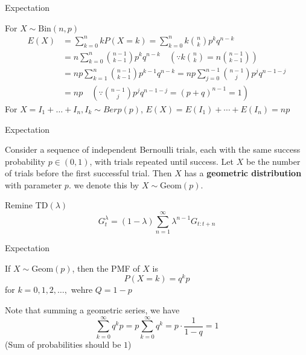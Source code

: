 \documentclass{beamer}
\newcommand{\tb}[1]{\textbf{#1}}
\begin{document}
\begin{frame}{Expectation}
    \begin{example}
        For $X \sim \text{Bin}(n,p)$
        \[
            \begin{aligned}
                E(X) &= \sum_{k=0}^n k P(X=k) = \sum_{k=0}^n k \binom{n}{k} p^k q^{n-k}\\
                &= n \sum^n_{k=0} \binom{n-1}{k-1} p^k q^{n-k} \quad (\because k \binom{n}{k} = n \binom{n-1}{k-1})\\
                &= np \sum^n_{k=1} \binom{n-1}{k-1} p^{k-1} q^{n-k} = np \sum_{j=0}^{n-1} \binom{n-1}{j}p^j q^{n-1-j} \\
                &= np \quad (\because \binom{n-1}{j}p^j q^{n-1-j} = (p + q)^{n-1} = 1)
            \end{aligned}
        \]
        For $X = I_1 + \dots + I_n, I_k \sim Berp(p)$, $E(X) = E(I_1) + \cdots + E(I_n) = np$
    \end{example}
\end{frame}


\begin{frame}{Expectation}
    \begin{definition}
        Consider a sequence of independent Bernoulli trials, each with the same success probability $p \in (0,1)$, with trials repeated until success. Let $X$ be the number of trials before the first successful trial. Then $X$ has a \tb{geometric distribution} with parameter $p$. we denote this by $X \sim \text{Geom}(p)$.\newline
    \end{definition}

    Remine TD$(\lambda)$
    \[
        G^\lambda_t = (1-\lambda) \sum^\infty_{n=1} \lambda^{n-1} G_{t:t+n}
    \]
\end{frame}

\begin{frame}{Expectation}
    \begin{theorem}
        If $X\sim\text{Geom}(p)$, then the PMF of $X$ is 
        \[
            P(X=k) = q^k p
        \]
        for $k = 0,1,2,\dots, $ wehre $Q = 1-p$
    \end{theorem}
    Note that summing a geometric series, we have
    \[
        \sum^\infty_{k=0} q^k p = p \sum^\infty_{k=0} q^k = p \cdot \frac{1}{1-q} = 1
    \]
    (Sum of probabilities should be $1$)
\end{frame}
\end{document}
